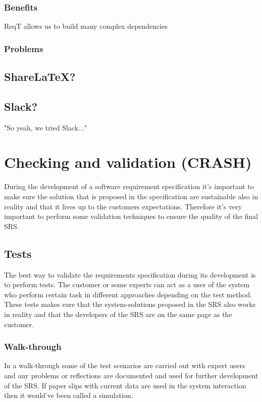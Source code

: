 \documentclass[10pt]{article}
\begin{document}
\subsubsection{Benefits}
ReqT allows us to build many complex dependencies
\subsubsection{Problems}

\subsection{ShareLaTeX?}

\subsection{Slack?}
"So yeah, we tried Slack..."

\section{Checking and validation (CRASH)}
\noindent
During the development of a software requirement specification it's important to make sure the solution that is proposed in the specification are sustainable also in reality and that it lives up to the customers expectations. Therefore it's very important to perform some validation techniques to ensure the quality of the final SRS.
\subsection{Tests}
The best way to validate the requirements specification during its development is to perform tests. The customer or some experts can act as a user of the system who perform certain task in different approaches depending on the test method. These tests makes sure that the system-solutions proposed in the SRS also works in reality and that the developers of the SRS are on the same page as the customer.

\subsubsection{Walk-through}
In a walk-through some of the test scenarios are carried out with expert users and any problems or reflections are documented and used for further development of the SRS. If paper slips with current data are used in the system interaction then it would've been called a simulation.
\end{document}
